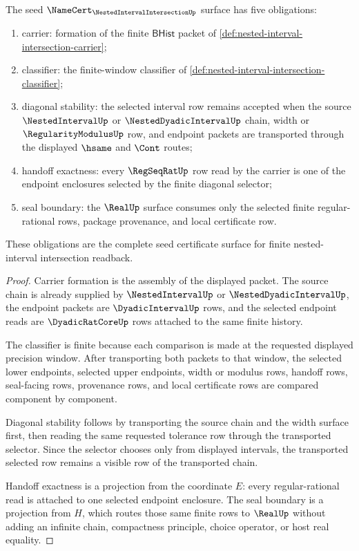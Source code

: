 \begin{theorem}
\label{thm:nested-interval-intersection-namecert-obligations}
The seed $\NameCert_{\NestedIntervalIntersectionUp}$ surface has five obligations:
\begin{enumerate}
\item carrier: formation of the finite $\mathsf{BHist}$ packet of \autoref{def:nested-interval-intersection-carrier};
\item classifier: the finite-window classifier of \autoref{def:nested-interval-intersection-classifier};
\item diagonal stability: the selected interval row remains accepted when the source $\NestedIntervalUp$ or $\NestedDyadicIntervalUp$ chain, width or $\RegularityModulusUp$ row, and endpoint packets are transported through the displayed $\hsame$ and $\Cont$ routes;
\item handoff exactness: every $\RegSeqRatUp$ row read by the carrier is one of the endpoint enclosures selected by the finite diagonal selector;
\item seal boundary: the $\RealUp$ surface consumes only the selected finite regular-rational rows, package provenance, and local certificate row.
\end{enumerate}
These obligations are the complete seed certificate surface for finite nested-interval intersection readback.
\end{theorem}
\begin{proof}
Carrier formation is the assembly of the displayed packet. The source chain is already supplied by $\NestedIntervalUp$ or $\NestedDyadicIntervalUp$, the endpoint packets are $\DyadicIntervalUp$ rows, and the selected endpoint reads are $\DyadicRatCoreUp$ rows attached to the same finite history.

The classifier is finite because each comparison is made at the requested displayed precision window. After transporting both packets to that window, the selected lower endpoints, selected upper endpoints, width or modulus rows, handoff rows, seal-facing rows, provenance rows, and local certificate rows are compared component by component.

Diagonal stability follows by transporting the source chain and the width surface first, then reading the same requested tolerance row through the transported selector. Since the selector chooses only from displayed intervals, the transported selected row remains a visible row of the transported chain.

Handoff exactness is a projection from the coordinate $E$: every regular-rational read is attached to one selected endpoint enclosure. The seal boundary is a projection from $H$, which routes those same finite rows to $\RealUp$ without adding an infinite chain, compactness principle, choice operator, or host real equality.
\end{proof}

